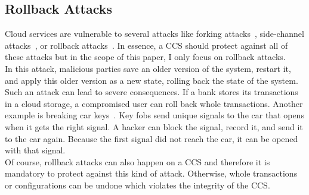 \subsection{Rollback Attacks}
Cloud services are vulnerable to several attacks like forking attacks~\cite{forkingAttacks}, side-channel attacks~\cite{sideChannel}, or rollback attacks~\cite{Rollback}. In essence, a CCS should protect against all of these attacks but in the scope of this paper, I only focus on rollback attacks.\\
In this attack, malicious parties save an older version of the system, restart it, and apply this older version as a new state, rolling back the state of the system. Such an attack can lead to severe consequences. If a bank stores its transactions in a cloud storage, a compromised user can roll back whole transactions. Another example is breaking car keys~\cite{rolljam}. Key fobs send unique signals to the car that opens when it gets the right signal. A hacker can block the signal, record it, and send it to the car again. Because the first signal did not reach the car, it can be opened with that signal.\\%
Of course, rollback attacks can also happen on a CCS and therefore it is mandatory to protect against this kind of attack. Otherwise, whole transactions or configurations can be undone which violates the integrity of the CCS.